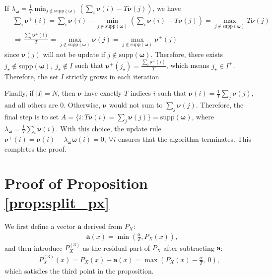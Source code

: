 \documentclass[11pt,letterpaper]{article}
\newcommand{\supp}{\mathrm{supp}}
\begin{document}
If $ \lambda_{\boldsymbol{\omega}} = \tfrac{1}{T}\min_{j \notin \supp(\boldsymbol{\omega})}(\sum_i \boldsymbol{\nu}(i) - T\boldsymbol{\nu}(j))$, we have
\begin{align}
    & \sum_i \boldsymbol{\nu}^+(i) = \sum_i \boldsymbol{\nu}(i) - \min_{j \notin \supp(\boldsymbol{\omega})}\left( \sum_i \boldsymbol{\nu}(i) - T\boldsymbol{\nu}(j)\right) = \max_{j \notin \supp(\boldsymbol{\omega})} T\boldsymbol{\nu}(j) \\
    & \Rightarrow \frac{\sum_i \boldsymbol{\nu}^+(i)}{T} = \max_{j \notin \supp(\boldsymbol{\omega})} \boldsymbol{\nu}(j) = \max_{j \notin \supp(\boldsymbol{\omega})} \boldsymbol{\nu}^+(j) \label{eq:a_enters_avg}
\end{align}
since $\boldsymbol{\nu}(j)$ will not be update if $j \notin \supp(\boldsymbol{\omega})$. Therefore, there exists $ j_{\star} \notin \supp(\boldsymbol{\omega}), \; {j_{\star}} \notin I$ such that $ \boldsymbol{\nu}^+({j_{\star}}) = \frac{\sum_i \boldsymbol{\nu}^+(i) }{T}$, which means ${j_{\star}} \in I^+$. Therefore, the set $I$ strictly grows in each iteration. 



Finally, if $|I| = N$, then $\boldsymbol{\nu}$ have exactly $T$ indices $i$ such that $\boldsymbol{\nu}(i) = \frac{1}{T}\sum_j \boldsymbol{\nu}(j)$, and all others are $0$. Otherwise, $\boldsymbol{\nu}$ would not sum to $\sum_j \boldsymbol{\nu}(j)$. Therefore, the final step is to set $A = \{i:T\boldsymbol{\nu}(i) = \sum_j \boldsymbol{\nu}(j) \} = \supp(\boldsymbol{\omega})$, where
$\lambda_{\boldsymbol{\omega}} = \tfrac{1}{T}\sum_i \boldsymbol{\nu}(i)$.
With this choice, the update rule
$\boldsymbol{\nu}^+(i) = \boldsymbol{\nu}(i) - \lambda_{\boldsymbol{\omega}}\boldsymbol{\omega}(i) = 0,\ \forall i$
ensures that the algorithm terminates. This completes the proof.


\section{Proof of Proposition \ref{prop:split_px}}\label{appendix:prop3}
We first define a vector $\boldsymbol{a}$ derived from $P_X$:
    \begin{align}
        & \boldsymbol{a}(x) = \min \left( \frac{\alpha }{T}, P_{X}(x)\right) , \label{eq:def_of_a}
    \end{align}
    and then introduce $P_X^{(3)}$ as the residual part of $P_X$ after subtracting $\boldsymbol{a}$:
    \begin{align}
        P_X^{(3)}(x) = P_X(x) - \boldsymbol{a}(x) = \max \left( P_{X}(x) -\frac{\alpha }{T} ,\  0\right),
    \end{align}
    which satisfies the third point in the proposition.
     
\end{document}
